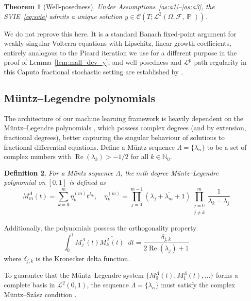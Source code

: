 \documentclass[11pt, a4paper]{article}
\theoremstyle{theoremstyle}
\newtheorem{theorem}{Theorem}[section]
\theoremstyle{definitionstyle}
\newtheorem{definition}[theorem]{Definition}
\newcommand{\dd}{\mathop{}\!d}
\DeclareMathOperator{\PP}{\mathbb P}
\renewcommand{\Re}{\operatorname{Re}}
\begin{document}
\begin{theorem}[Well-posedness]\label{thm:well_posed}
    Under Assumptions~\ref{as:a1}--\ref{as:a3}, the SVIE~\eqref{eq:svie} admits a unique solution $y \in \mathcal C(T; \mathcal L^2(\Omega, \mathcal F, \PP))$.
\end{theorem}
We do not reprove this here. It is a standard Banach fixed-point argument for weakly singular Volterra equations with Lipschitz, linear-growth coefficients, entirely analogous to the Picard iteration we use for a different purpose in the proof of Lemma~\ref{lem:mall_dev_y}, and well-posedness and $\mathcal L^p$ path regularity in this Caputo fractional stochastic setting are established by \cite{huong2023lp}.

\subsection{M\"untz--Legendre polynomials}\label{sec:muntz_legendre}
The architecture of our machine learning framework is heavily dependent on the M\"untz--Legendre polynomials \cite{milovanovic1999muntz}, which possess complex degrees (and by extension, fractional degrees), better capturing the singular behaviour of solutions to fractional differential equations. Define a M\"untz sequence $\Lambda = \{\lambda_n\}$ to be a set of complex numbers with $\Re (\lambda_k) > -1/2$ for all $k \in \mathbb N_0$.

\begin{definition}\label{def:muntz_legendre}
    For a M\"untz sequence $\Lambda$, the $m$th degree M\"untz--Legendre polynomial on $[0, 1]$ is defined as
    \begin{equation}
        M^{\Lambda}_m(t) = \sum_{k=0}^m \eta^{(m)}_k t^{\lambda_k}, \quad \eta^{(m)}_k = \prod_{j=0}^{m-1} (\lambda_j + \overline{\lambda_m} + 1) \prod_{\substack{j=0 \\ j \neq k}}^m \frac{1}{\lambda_k - \lambda_j}
    \end{equation} 
\end{definition}
Additionally, the polynomials possess the orthogonality property
\begin{equation}\label{eq:muntz_orthogonality}
    \int_0^1 M^{\Lambda}_j(t)\overline{M^\Lambda_k(t)}\dd{t} = \frac{\delta_{j,k}}{2\Re (\lambda_j) + 1}
\end{equation}
where $\delta_{j,k}$ is the Kronecker delta function.

To guarantee that the M\"untz--Legendre system $\{M_0^\Lambda(t), M_1^\Lambda(t), \dots\}$ forms a complete basis in $\mathcal L^2(0, 1)$, the sequence $\Lambda = \{\lambda_n\}$ must satisfy the complex M\"untz--Sz\'{a}sz condition \cite{szasz1916}.
\end{document}
